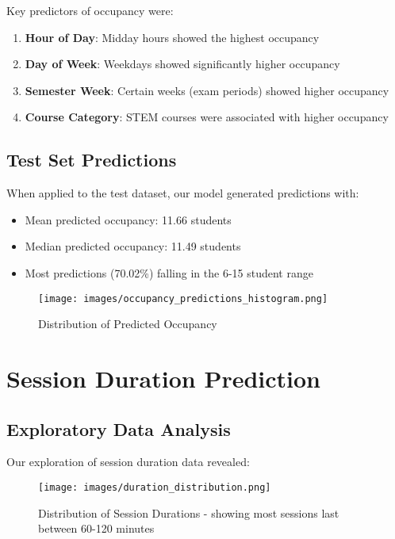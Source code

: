 \documentclass[12pt,letterpaper]{article}
\begin{document}
Key predictors of occupancy were:
\begin{enumerate}
    \item \textbf{Hour of Day}: Midday hours showed the highest occupancy
    \item \textbf{Day of Week}: Weekdays showed significantly higher occupancy
    \item \textbf{Semester Week}: Certain weeks (exam periods) showed higher occupancy
    \item \textbf{Course Category}: STEM courses were associated with higher occupancy
\end{enumerate}

\subsection{Test Set Predictions}

When applied to the test dataset, our model generated predictions with:
\begin{itemize}
    \item Mean predicted occupancy: 11.66 students
    \item Median predicted occupancy: 11.49 students
    \item Most predictions (70.02\%) falling in the 6-15 student range
\end{itemize}

\begin{figure}[H]
    \centering
    \texttt{[image: images/occupancy\_predictions\_histogram.png]}
    \caption{Distribution of Predicted Occupancy}
\end{figure}

\section{Session Duration Prediction}

\subsection{Exploratory Data Analysis}

Our exploration of session duration data revealed:

\begin{figure}[H]
    \centering
    \texttt{[image: images/duration\_distribution.png]}
    \caption{Distribution of Session Durations - showing most sessions last between 60-120 minutes}
\end{figure}
\end{document}
